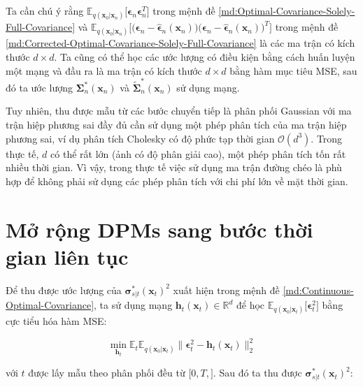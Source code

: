 \documentclass[14pt, a4paper]{article}
\numberwithin{equation}{section}
\numberwithin{figure}{section}
\numberwithin{dl}{section}
\numberwithin{md}{section}
\numberwithin{bd}{section}
\numberwithin{dn}{section}
\numberwithin{hq}{section}
\begin{document}
    Ta cần chú ý rằng $\mathbb{E}_{q(\boldsymbol{x}_0 \vert \boldsymbol{x}_n)} \lbrack \boldsymbol{\epsilon}_n \boldsymbol{\epsilon}_n^T \rbrack$ trong mệnh đề \ref{md:Optimal-Covariance-Solely-Full-Covariance} và $\mathbb{E}_{q(\boldsymbol{x}_0 \vert \boldsymbol{x}_n)} \big \lbrack \big( \boldsymbol{\epsilon}_n - \hat{\boldsymbol{\epsilon}}_n (\boldsymbol{x}_n) \big) \big( \boldsymbol{\epsilon}_n - \hat{\boldsymbol{\epsilon}}_n (\boldsymbol{x}_n) \big)^T \big \rbrack$ trong mệnh đề \ref{md:Corrected-Optimal-Covariance-Solely-Full-Covariance} là các ma trận có kích thước $d\times d$.
    Ta cũng có thể học các ước lượng có điều kiện bằng cách huấn luyện một mạng và đầu ra là ma trận có kích thước $d \times d$ bằng hàm mục tiêu MSE, sau đó ta ước lượng $\boldsymbol{\Sigma}_n^{\ast} (\boldsymbol{x}_n)$ và $\tilde{\boldsymbol{\Sigma}}_n^{\ast} (\boldsymbol{x}_n)$ sử dụng mạng.

    Tuy nhiên, thu được mẫu từ các bước chuyển tiếp là phân phối Gaussian với ma trận hiệp phương sai đầy đủ cần sử dụng một phép phân tích của ma trận hiệp phương sai, ví dụ phân tích Cholesky có độ phức tạp thời gian $\mathcal{O}(d^3)$.
    Trong thực tế, $d$ có thể rất lớn (ảnh có độ phân giải cao), một phép phân tích tốn rất nhiều thời gian.
    Vì vậy, trong thực tế việc sử dụng ma trận đường chéo là phù hợp để không phải sử dụng các phép phân tích với chi phí lớn về mặt thời gian.

    \section{Mở rộng DPMs sang bước thời gian liên tục} \label{Appen:Section:Extention-to-DPMs-with-Continuous-Timesteps}

    Để thu được ước lượng của $\boldsymbol{\sigma}_{s \vert t}^{\ast} (\boldsymbol{x}_t)^2$ xuất hiện trong mệnh đề \ref{md:Continuous-Optimal-Covariance}, ta sử dụng mạng $\boldsymbol{h}_t (\boldsymbol{x}_t) \in \mathbb{R}^d$ để học $\mathbb{E}_{q(\boldsymbol{x}_0 \vert \boldsymbol{x}_t)} \lbrack \boldsymbol{\epsilon}_t^2 \rbrack$ bằng cực tiểu hóa hàm MSE:

    \begin{equation}
        \min_{\boldsymbol{h}_t} \mathbb{E}_t \mathbb{E}_{q(\boldsymbol{x}_0 \vert \boldsymbol{x}_t)} \lVert \boldsymbol{\epsilon}_t^2 - \boldsymbol{h}_t (\boldsymbol{x}_t) \rVert_2^2
    \end{equation}

    với $t$ được lấy mẫu theo phân phối đều từ $\lbrack 0, T, \rbrack$. Sau đó ta thu được $\boldsymbol{\sigma}_{s \vert t}^{\ast} (\boldsymbol{x}_t)^2$:
\end{document}
